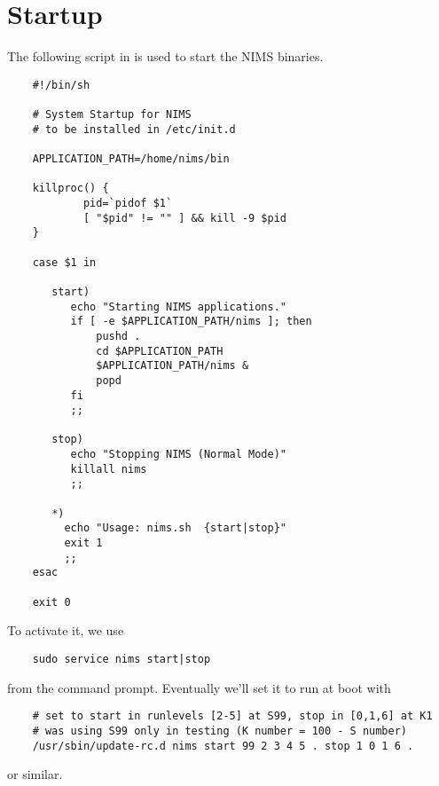 \documentclass[11pt]{article}
\newcommand{\path}[1]{{\small\bfseries\ttfamily{#1}}}
\begin{document}
\section{Startup}
The following script in \path{/etc/init.d} is used to
start the NIMS binaries.
\begin{lstlisting}
    #!/bin/sh

    # System Startup for NIMS
    # to be installed in /etc/init.d

    APPLICATION_PATH=/home/nims/bin

    killproc() {
            pid=`pidof $1`
            [ "$pid" != "" ] && kill -9 $pid
    }

    case $1 in

       start)
          echo "Starting NIMS applications."
          if [ -e $APPLICATION_PATH/nims ]; then
              pushd .
              cd $APPLICATION_PATH
              $APPLICATION_PATH/nims &
              popd
          fi
          ;; 

       stop)
          echo "Stopping NIMS (Normal Mode)"
          killall nims
          ;;

       *)
         echo "Usage: nims.sh  {start|stop}"
         exit 1
         ;;
    esac

    exit 0
\end{lstlisting}
To activate it, we use
\begin{lstlisting}
    sudo service nims start|stop
\end{lstlisting}
from the command prompt. Eventually we'll set it to run at boot with
\begin{lstlisting}
    # set to start in runlevels [2-5] at S99, stop in [0,1,6] at K1
    # was using S99 only in testing (K number = 100 - S number)
    /usr/sbin/update-rc.d nims start 99 2 3 4 5 . stop 1 0 1 6 .
\end{lstlisting}
or similar.
\end{document}
